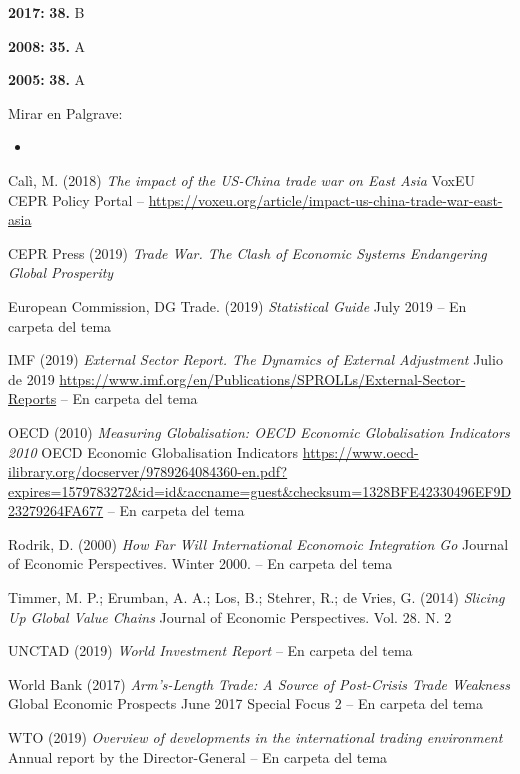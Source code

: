 \documentclass{nuevotema}
\begin{document}
\notas

\textbf{2017:} \textbf{38.} B

\textbf{2008:} \textbf{35.} A

\textbf{2005:} \textbf{38.} A

\bibliografia

Mirar en Palgrave:
\begin{itemize}
	\item
\end{itemize}

Calì, M. (2018) \textit{The impact of the US-China trade war on East Asia} VoxEU CEPR Policy Portal -- \url{https://voxeu.org/article/impact-us-china-trade-war-east-asia}

CEPR Press (2019) \textit{Trade War. The Clash of Economic Systems Endangering Global Prosperity} 

European Commission, DG Trade. (2019) \textit{Statistical Guide} July 2019 -- En carpeta del tema

IMF (2019) \textit{External Sector Report. The Dynamics of External Adjustment} Julio de 2019 \url{https://www.imf.org/en/Publications/SPROLLs/External-Sector-Reports} -- En carpeta del tema

OECD (2010) \textit{Measuring Globalisation: OECD Economic Globalisation Indicators 2010} OECD Economic Globalisation Indicators \url{https://www.oecd-ilibrary.org/docserver/9789264084360-en.pdf?expires=1579783272&id=id&accname=guest&checksum=1328BFE42330496EF9D23279264FA677} -- En carpeta del tema

Rodrik, D. (2000) \textit{How Far Will International Economoic Integration Go} Journal of Economic Perspectives. Winter 2000. -- En carpeta del tema

Timmer, M. P.; Erumban, A. A.; Los, B.; Stehrer, R.; de Vries, G. (2014) \textit{Slicing Up Global Value Chains} Journal of Economic Perspectives. Vol. 28. N. 2

UNCTAD (2019) \textit{World Investment Report} -- En carpeta del tema

World Bank (2017) \textit{Arm's-Length Trade: A Source of Post-Crisis Trade Weakness} Global Economic Prospects June 2017 Special Focus 2 -- En carpeta del tema

WTO (2019) \textit{Overview of developments in the international trading environment} Annual report by the Director-General -- En carpeta del tema
\end{document}
